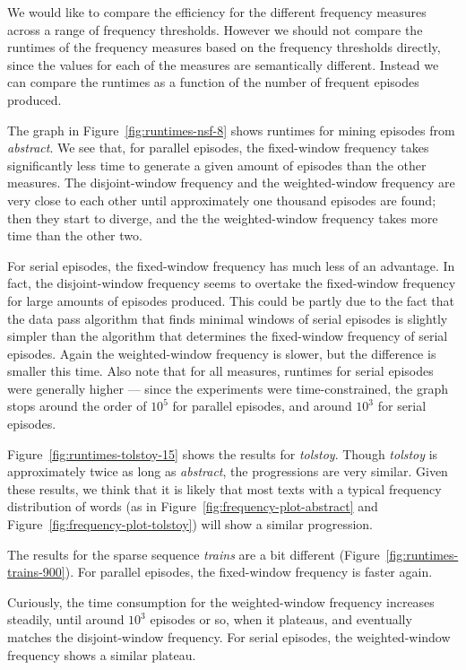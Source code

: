We would like to compare the efficiency for the different frequency measures across a range of frequency thresholds. However we should not compare the runtimes of the frequency measures based on the frequency thresholds directly, since the values for each of the measures are semantically different. Instead we can compare the runtimes as a function of the number of frequent episodes produced.

The graph in Figure~\ref{fig:runtimes-nsf-8} shows runtimes for mining episodes from \emph{abstract}. We see that, for parallel episodes, the fixed-window frequency takes significantly less time to generate a given amount of episodes than the other measures. The disjoint-window frequency and the weighted-window frequency are very close to each other until approximately one thousand episodes are found; then they start to diverge, and the the weighted-window frequency takes more time than the other two.


For serial episodes, the fixed-window frequency has much less of an advantage. In fact, the disjoint-window frequency seems to overtake the fixed-window frequency for large amounts of episodes produced. This could be partly due to the fact that the data pass algorithm that finds minimal windows of serial episodes is slightly simpler than the algorithm that determines the fixed-window frequency of serial episodes. Again the weighted-window frequency is slower, but the difference is smaller this time. Also note that for all measures, runtimes for serial episodes were generally higher --- since the experiments were time-constrained, the graph stops around the order of $ 10^5 $ for parallel episodes, and around $ 10^3 $ for serial episodes.

Figure~\ref{fig:runtimes-tolstoy-15} shows the results for \emph{tolstoy}. Though \emph{tolstoy} is approximately twice as long as \emph{abstract}, the progressions are very similar. Given these results, we think that it is likely that most texts with a typical frequency distribution of words (as in Figure~\ref{fig:frequency-plot-abstract} and Figure~\ref{fig:frequency-plot-tolstoy}) will show a similar progression.

The results for the sparse sequence \emph{trains} are a bit different (Figure~\ref{fig:runtimes-trains-900}). For parallel episodes, the fixed-window frequency is faster again.

Curiously, the time consumption for the weighted-window frequency increases steadily, until around $ 10^3 $ episodes or so, when it plateaus, and eventually matches the disjoint-window frequency. For serial episodes, the weighted-window frequency shows a similar plateau.


